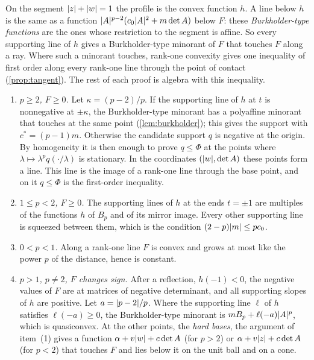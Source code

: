 On the segment $\lvert z\rvert+\lvert w\rvert=1$ the profile is the convex function $h$. A line below $h$ is the
same as a function $\lvert A\rvert^{p-2}(c_0\lvert A\rvert^2+m\det A)$ below $F$: these \emph{Burkholder-type
functions} are the ones whose restriction to the segment is affine. So every supporting line of
$h$ gives a Burkholder-type minorant of $F$ that touches $F$ along a ray. Where such a minorant
touches, rank-one convexity gives one inequality of first order along every rank-one line
through the point of contact (\cref{prop:tangent}). The rest of each proof is algebra with this
inequality.
\begin{enumerate}[label=\textup{(\arabic*)}]
\item \emph{$p\ge2$, $F\ge0$.} Let $\kappa=(p-2)/p$. If the supporting line of $h$ at $t$ is
  nonnegative at $\pm\kappa$, the Burkholder-type minorant has a polyaffine minorant that touches
  at the same point (\cref{lem:burkholder}); this gives the support with $c^\ast=(p-1)m$.
  Otherwise the candidate support $q$ is negative at the origin. By homogeneity it is then enough
  to prove $q\le\Phi$ at the points where $\lambda\mapsto\lambda^pq(\cdot/\lambda)$ is
  stationary. In the coordinates $(\lvert w\rvert,\det A)$ these points form a line. This line is the
  image of a rank-one line through the base point, and on it $q\le\Phi$ is the first-order
  inequality.
\item \emph{$1\le p<2$, $F\ge0$.} The supporting lines of $h$ at the ends $t=\pm1$ are multiples
  of the functions $h$ of $B_p$ and of its mirror image. Every other supporting line is squeezed
  between them, which is the condition $(2-p)\lvert m\rvert\le pc_0$.
\item \emph{$0<p<1$.} Along a rank-one line $F$ is convex and grows at most like the power $p$
  of the distance, hence is constant.
\item \emph{$p>1$, $p\ne2$, $F$ changes sign.} After a reflection, $h(-1)<0$, the negative values
  of $F$ are at matrices of negative determinant, and all supporting slopes of $h$ are positive.
  Let $a=\lvert p-2\rvert/p$. Where the supporting line $\ell$ of $h$ satisfies $\ell(-a)\ge0$, the
  Burkholder-type minorant is $mB_p+\ell(-a)\lvert A\rvert^p$, which is quasiconvex. At the other points,
  the \emph{hard bases}, the argument of item~(1) gives a function $\alpha+v\lvert w\rvert+c\det A$ (for
  $p>2$) or $\alpha+v\lvert z\rvert+c\det A$ (for $p<2$) that touches $F$ and lies below it on the unit
  ball and on a cone.


\end{enumerate}
